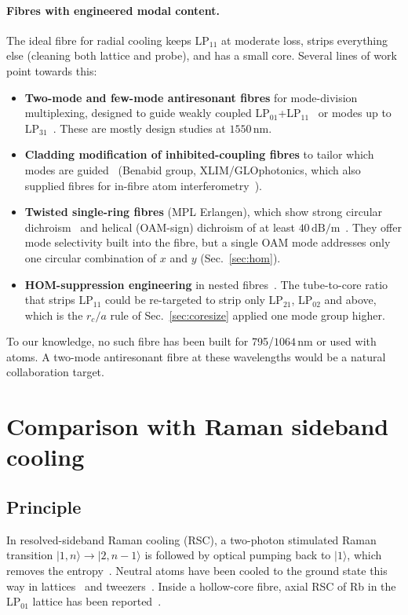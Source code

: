 \documentclass[11pt,a4paper]{article}
\newcommand{\SI}[2]{\ensuremath{#1\,\mathrm{#2}}}
\newcommand{\ket}[1]{|#1\rangle}
\begin{document}
\paragraph{Fibres with engineered modal content.} The ideal fibre for radial cooling keeps LP$_{11}$ at moderate loss, strips everything else (cleaning both lattice and probe), and has a small core. Several lines of work point towards this:
\begin{itemize}
\item \textbf{Two-mode and few-mode antiresonant fibres} for mode-division multiplexing, designed to guide weakly coupled LP$_{01}$+LP$_{11}$~\cite{wangzhuo2020} or modes up to LP$_{31}$~\cite{liu2022}. These are mostly design studies at \SI{1550}{nm}.
\item \textbf{Cladding modification of inhibited-coupling fibres} to tailor which modes are guided~\cite{osorio2019} (Benabid group, XLIM/GLOphotonics, which also supplied fibres for in-fibre atom interferometry~\cite{wang2022}).
\item \textbf{Twisted single-ring fibres} (MPL Erlangen), which show strong circular dichroism~\cite{roth2018} and helical (OAM-sign) dichroism of at least \SI{40}{dB/m}~\cite{helfrich2025}. They offer mode selectivity built into the fibre, but a single OAM mode addresses only one circular combination of $x$ and $y$ (Sec.~\ref{sec:hom}).
\item \textbf{HOM-suppression engineering} in nested fibres~\cite{gao2024,poletti2014,uebel2016}. The tube-to-core ratio that strips LP$_{11}$ could be re-targeted to strip only LP$_{21}$, LP$_{02}$ and above, which is the $r_c/a$ rule of Sec.~\ref{sec:coresize} applied one mode group higher.
\end{itemize}
To our knowledge, no such fibre has been built for 795/\SI{1064}{nm} or used with atoms. A two-mode antiresonant fibre at these wavelengths would be a natural collaboration target.

\section{Comparison with Raman sideband cooling}
\label{sec:rsc}
\subsection{Principle}
In resolved-sideband Raman cooling (RSC), a two-photon stimulated Raman transition $\ket{1,n}\to\ket{2,n-1}$ is followed by optical pumping back to $\ket1$, which removes the entropy~\cite{monroe1995,hamann1998,vuletic1998,kerman2000}. Neutral atoms have been cooled to the ground state this way in lattices~\cite{hamann1998,kerman2000} and tweezers~\cite{kaufman2012,thompson2013}. Inside a hollow-core fibre, axial RSC of Rb in the LP$_{01}$ lattice has been reported~\cite{leong2020}.
\end{document}
